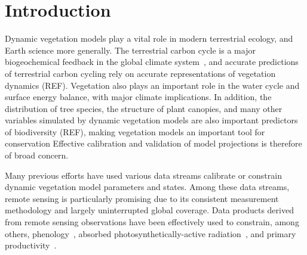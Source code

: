 \section{Introduction}

Dynamic vegetation models play a vital role in modern terrestrial ecology, and Earth science more generally.
The terrestrial carbon cycle is a major biogeochemical feedback in the global climate system~\parencite{heinze_2019_esd_reviews}, and accurate predictions of terrestrial carbon cycling rely on accurate representations of vegetation dynamics (REF). %
Vegetation also plays an important role in the water cycle and surface energy balance, with major climate implications.
In addition, the distribution of tree species, the structure of plant canopies, and many other variables simulated by dynamic vegetation models are also important predictors of biodiversity (REF), making vegetation models an important tool for conservation %
Effective calibration and validation of model projections is therefore of broad concern.


Many previous efforts have used various data streams calibrate or constrain dynamic vegetation model parameters and states.
Among these data streams, remote sensing is particularly promising due to its consistent measurement methodology and largely uninterrupted global coverage.
Data products derived from remote sensing observations have been effectively used to constrain, among others,
phenology~\parencite{knorr2010carbon, viskari2015modeldata},
absorbed photosynthetically-active radiation~\parencite{peylin2016new, schurmann2016constraining},
and primary productivity~\parencite{macbean2018strong}.

